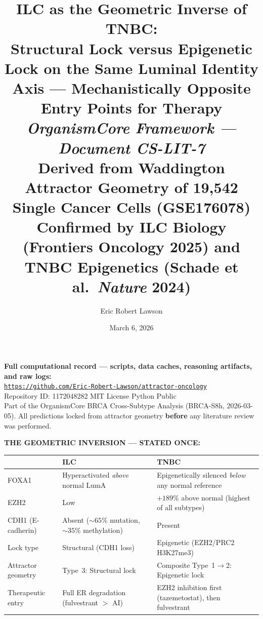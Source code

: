 \documentclass[12pt, a4paper]{article}
\title{
    \vspace{-1em}
    \textbf{ILC as the Geometric Inverse of TNBC:}\\[0.5em]
    \large Structural Lock versus Epigenetic Lock on
    the Same Luminal Identity Axis --- Mechanistically
    Opposite Entry Points for Therapy\\[0.4em]
    \normalsize \textit{OrganismCore Framework ---
    Document CS-LIT-7}\\[0.3em]
    \small Derived from Waddington Attractor Geometry
    of 19,542 Single Cancer Cells (GSE176078)\\[0.3em]
    \small Confirmed by ILC Biology (Frontiers Oncology
    2025) and TNBC Epigenetics (Schade et al.\
    \textit{Nature} 2024)
}
\author[1]{Eric Robert Lawson}
\affil[1]{
    OrganismCore\\
    \href{mailto:OrganismCore@proton.me}
         {OrganismCore@proton.me}\\
    ORCID:
    \href{https://orcid.org/0009-0002-0414-6544}
         {0009-0002-0414-6544}
}
\date{March 6, 2026}
\begin{document}

\maketitle
\thispagestyle{fancy}

\begin{center}
\colorbox{repobox}{
\begin{minipage}{0.88\textwidth}
\vspace{0.5em}
\centering
\textbf{Full computational record --- scripts, data
caches, reasoning artifacts, and raw logs:}\\[0.4em]
\href{https://github.com/Eric-Robert-Lawson/attractor-oncology}
{\texttt{https://github.com/Eric-Robert-Lawson/attractor-oncology}}
\\[0.3em]
\small Repository ID: 1172048282 \textbar{}
MIT License \textbar{}
Python \textbar{}
Public\\[0.2em]
Part of the OrganismCore BRCA Cross-Subtype Analysis
(BRCA-S8h, 2026-03-05). All predictions locked from
attractor geometry \textbf{before} any literature review
was performed.
\vspace{0.5em}
\end{minipage}}
\end{center}

\vspace{0.8em}

\begin{center}
\colorbox{axisbox}{
\begin{minipage}{0.88\textwidth}
\vspace{0.5em}
\centering
\textbf{THE GEOMETRIC INVERSION --- STATED ONCE:}\\[0.6em]
\begin{tabular}{p{3.5cm}p{4cm}p{4cm}}
\toprule
& \textbf{\textcolor{green!50!black}{ILC}} &
  \textbf{\textcolor{red!70!black}{TNBC}} \\
\midrule
FOXA1 &
Hyperactivated \textit{above} normal LumA &
Epigenetically silenced \textit{below} any
normal reference \\[0.3em]
EZH2 &
Low &
$+189\%$ above normal (highest of all subtypes) \\[0.3em]
CDH1 (E-cadherin) &
Absent (${\sim}65\%$ mutation,
${\sim}35\%$ methylation) &
Present \\[0.3em]
Lock type &
Structural (CDH1 loss) &
Epigenetic (EZH2/PRC2 H3K27me3) \\[0.3em]
Attractor geometry &
Type~3: Structural lock &
Composite Type~1$\rightarrow$2:
Epigenetic lock \\[0.3em]
Therapeutic entry &
Full ER degradation
(fulvestrant $>$ AI) &
EZH2 inhibition first
(tazemetostat), then fulvestrant \\
\bottomrule
\end{tabular}
\vspace{0.5em}
\end{minipage}}
\end{center}
\end{document}
